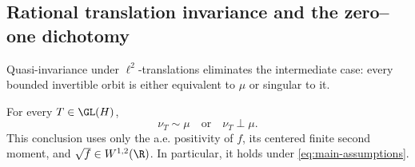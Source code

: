 \subsection{Rational translation invariance and the zero--one dichotomy}
\label{sec:translation-dichotomy}

Quasi-invariance under \(\ell^2\)-translations eliminates the intermediate
case: every bounded invertible orbit is either equivalent to \(\mu\) or
singular to it.

\begin{lemma}
\label{lem:orbit-dichotomy}
For every \(T\in\GL(H)\),
\begin{equation}
  \nu_T\sim\mu\quad\text{or}\quad\nu_T\perp\mu.
  \label{eq:orbit-dichotomy}
\end{equation}
This conclusion uses only the a.e. positivity of \(f\), its centered finite second
moment, and \(\sqrt f\in W^{1,2}(\R)\).
In particular, it holds under \eqref{eq:main-assumptions}.
\end{lemma}

